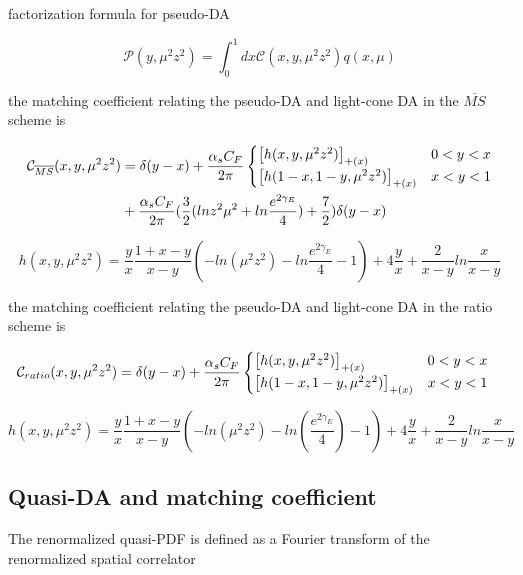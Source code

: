 \documentclass{article}
\begin{document}
factorization formula for pseudo-DA

\begin{equation}
   \mathcal{P}(y,\mu^2z^2)= \int_{0}^{1} dx	\mathcal{C}(x,y,\mu^2z^2) q(x,\mu)
\end{equation}

the matching coefficient relating the pseudo-DA and light-cone DA in the $\overline{MS}$ scheme is

\begin{align}
	\mathcal{C}_{\overline{MS}}(x,y,\mu^2z^2)&= \delta(y-x)+\frac{\alpha_s C_F}{2\pi}\begin{cases}
		\qty[h(x,y,\mu^2z^2)]_{+(x)} & 0<y<x \\
		\qty[h(1-x,1-y,\mu^2z^2)]_{+(x)} & x<y<1  \notag
	\end{cases}\notag\\ & + \frac{\alpha_s C_F}{2\pi} (\frac{3}{2}(ln z^2\mu^2+ln\dfrac{e^{2\gamma_E}}{4})+\frac{7}{2})\delta(y-x) \notag
    \end{align}

\begin{equation}
	h(x,y,\mu^2z^2)= \frac{y}{x}\frac{1+x-y}{x-y}(-ln(\mu^2 z^2)-ln\frac{e^{2\gamma_E}}{4}-1)+4\frac{y}{x}+\frac{2}{x-y}ln\frac{x}{x-y}
\end{equation}

the matching coefficient relating the pseudo-DA and light-cone DA in the ratio scheme is
  
     \begin{align}
  	\mathcal{C}_{ratio}(x,y,\mu^2z^2)&= \delta(y-x)+\frac{\alpha_s C_F}{2\pi}\begin{cases}
  		\qty[h(x,y,\mu^2z^2)]_{+(x)} & 0<y<x \\
  		\qty[h(1-x,1-y,\mu^2z^2)]_{+(x)} & x<y<1  \notag
  	\end{cases}\notag
  \end{align}
  
  \begin{equation}
  	h(x,y,\mu^2z^2)= \frac{y}{x}\frac{1+x-y}{x-y}(-ln(\mu^2 z^2)-ln(\frac{e^{2\gamma_E}}{4})-1)+4\frac{y}{x}+\frac{2}{x-y}ln\frac{x}{x-y}
  \end{equation}

\subsection{Quasi-DA and matching coefficient}
The renormalized quasi-PDF is defined as a Fourier transform of the renormalized spatial correlator
  
\end{document}
